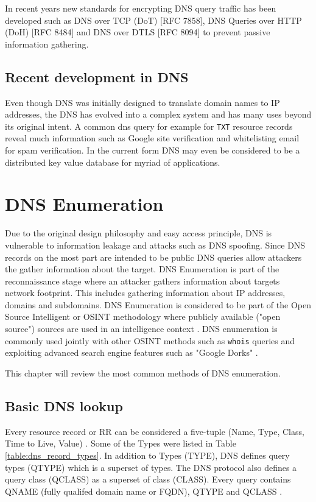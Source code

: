 In recent years new standards for encrypting DNS query traffic has been developed such as DNS over TCP (DoT) [RFC 7858], DNS Queries over HTTP (DoH) [RFC 8484] and DNS over DTLS [RFC 8094] to prevent passive information gathering. 


\subsection{Recent development in DNS}

Even though DNS was initially designed to translate domain names to IP addresses, the DNS has evolved into a complex system and has many uses beyond its original intent. A common dns query for example for \texttt{TXT} resource records reveal much information such as Google site verification and whitelisting email for spam verification. In the current form DNS may even be considered to be a distributed key value database for myriad of applications.

\section{DNS Enumeration}

Due to the original design philosophy and easy access principle, DNS is vulnerable to information leakage and attacks such as DNS spoofing. Since DNS records on the most part are intended to be public DNS queries allow attackers the gather information about the target. DNS Enumeration is part of the reconnaissance stage where an attacker gathers information about targets network footprint. This includes gathering information about IP addresses, domains and subdomains. DNS Enumeration is considered to be part of the Open Source Intelligent or OSINT methodology where publicly available ("open source") sources are used in an intelligence context \cite{network_sec_assessment}. DNS enumeration is commonly used jointly with other OSINT methods such as \texttt{whois} queries and exploiting advanced search engine features such as "Google Dorks" \cite{network_sec_assessment}.

This chapter will review the most common methods of DNS enumeration.

\subsection{Basic DNS lookup}

Every resource record or RR can be considered a five-tuple (Name, Type, Class, Time to Live, Value) \cite{RFC1035}. Some of the Types were listed in Table \ref{table:dns_record_types}. In addition to Types (TYPE), DNS defines query types (QTYPE) which is a superset of types. The DNS protocol also defines a query class (QCLASS) as a superset of class (CLASS). Every query contains QNAME (fully qualifed domain name or FQDN), QTYPE and QCLASS \cite{RFC1035}.

